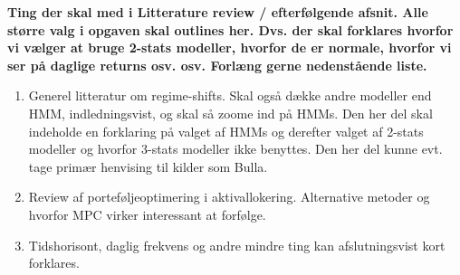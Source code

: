 
\textbf{Ting der skal med i Litterature review / efterfølgende afsnit. Alle større valg i opgaven skal outlines her. Dvs. der skal forklares hvorfor vi vælger at bruge 2-stats modeller, hvorfor de er normale, hvorfor vi ser på daglige returns osv. osv. Forlæng gerne nedenstående liste.}
\begin{enumerate}
    \item Generel litteratur om regime-shifts. Skal også dække andre modeller end HMM, indledningsvist, og skal så zoome ind på HMMs. Den her del skal indeholde en forklaring på valget af HMMs og derefter valget af 2-stats modeller og hvorfor 3-stats modeller ikke benyttes. Den her del kunne evt. tage primær henvising til kilder som Bulla.
    \item Review af porteføljeoptimering i aktivallokering. Alternative metoder og hvorfor MPC virker interessant at forfølge.
    \item Tidshorisont, daglig frekvens og andre mindre ting kan afslutningsvist kort forklares.
\end{enumerate}
    
